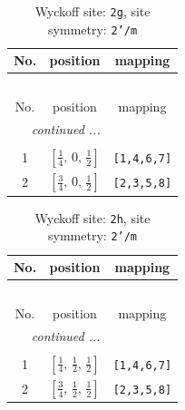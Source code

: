 \documentclass[fleqn,8pt]{jsarticle}
\begin{document}
\begin{longtable}{ccc}
\caption{Wyckoff site: {\tt 2g}, site symmetry: {\tt 2'/m}}
 \\
 \hline \hline
No. & position & mapping \\ \hline \endfirsthead

\multicolumn{2}{l}{\tablename\ \thetable{}} \\
 \hline \hline
No. & position & mapping \\ \hline \endhead

 \hline \hline
\multicolumn{2}{r}{\footnotesize\it continued ...} \\ \endfoot

 \hline \hline
\multicolumn{2}{r}{} \\ \endlastfoot

1 & $\left[ \frac{1}{4},\, 0,\, \frac{1}{2} \right]$ & {\tt [1,4,6,7]} \\ \hline
2 & $\left[ \frac{3}{4},\, 0,\, \frac{1}{2} \right]$ & {\tt [2,3,5,8]} \\
\end{longtable}
\renewcommand{\arraystretch}{1.2}
\begin{longtable}{ccc}
\caption{Wyckoff site: {\tt 2h}, site symmetry: {\tt 2'/m}}
 \\
 \hline \hline
No. & position & mapping \\ \hline \endfirsthead

\multicolumn{2}{l}{\tablename\ \thetable{}} \\
 \hline \hline
No. & position & mapping \\ \hline \endhead

 \hline \hline
\multicolumn{2}{r}{\footnotesize\it continued ...} \\ \endfoot

 \hline \hline
\multicolumn{2}{r}{} \\ \endlastfoot

1 & $\left[ \frac{1}{4},\, \frac{1}{2},\, \frac{1}{2} \right]$ & {\tt [1,4,6,7]} \\ \hline
2 & $\left[ \frac{3}{4},\, \frac{1}{2},\, \frac{1}{2} \right]$ & {\tt [2,3,5,8]} \\
\end{longtable}
\renewcommand{\arraystretch}{1.2}
\end{document}
